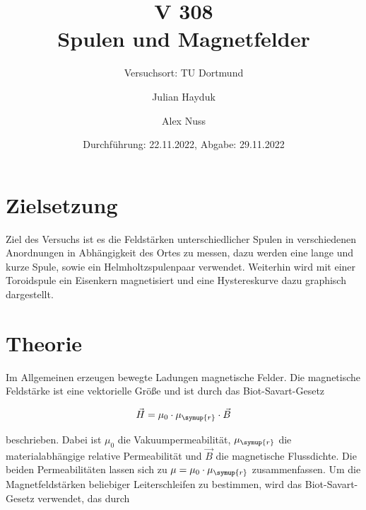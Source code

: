 \documentclass[
  bibliography=totoc,     %
  captions=tableheading,  %
  titlepage=firstiscover, %
]{scrartcl}
\begin{document}
  \setlength{\parindent}{0em} %
  \pagestyle{scrheadings}
  \clearpairofpagestyles
  \ofoot{\pagemark}

  \title{V 308 \\Spulen und Magnetfelder}
  \author{Julian Hayduk \and Alex Nuss}
  \date{Durchführung: 22.11.2022, Abgabe: 29.11.2022}
  \subtitle{Versuchsort: TU Dortmund }
  \maketitle

  \thispagestyle{empty}
  \newpage
  
  \tableofcontents


  
  \setcounter{page}{1}
  
  \newpage
  \section{Zielsetzung}
  \label{sec:Zielsetzung}
  
  Ziel des Versuchs ist es die Feldstärken unterschiedlicher Spulen in verschiedenen Anordnungen in
  Abhängigkeit des Ortes zu messen, dazu werden eine lange und kurze Spule, sowie ein Helmholtzspulenpaar verwendet.
  Weiterhin wird mit einer Toroidspule ein Eisenkern magnetisiert und eine
  Hystereskurve dazu graphisch dargestellt.
  
  \section{Theorie}
  \label{sec:Theorie}
  
  Im Allgemeinen erzeugen bewegte Ladungen magnetische Felder. Die magnetische Feldstärke ist eine vektorielle Größe
  und ist durch das Biot-Savart-Gesetz
  
  \begin{equation}
    \label{eqn:magFeldstaerke}
    \vec{H} = \mu_{0}\cdot\mu_{\symup{r}}\cdot \vec{B}
  \end{equation}
  
  beschrieben. Dabei ist $\mu_{0}$ die Vakuumpermeabilität, $\mu_{\symup{r}}$ die materialabhängige relative
  Permeabilität und $\vec{B}$ die magnetische Flussdichte. Die beiden Permeabilitäten lassen sich zu
  $\mu = \mu_0 \cdot \mu_{\symup{r}}$ zusammenfassen. Um die Magnetfeldstärken beliebiger
  Leiterschleifen zu bestimmen, wird das Biot-Savart-Gesetz verwendet, das durch
  
\end{document}
